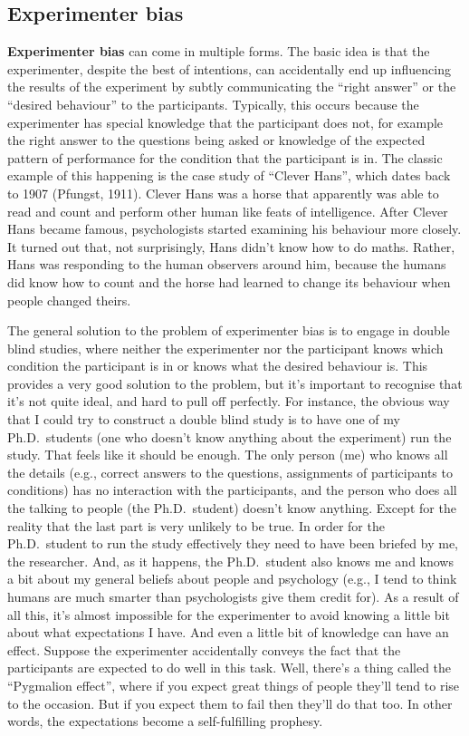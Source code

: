 \documentclass[
  letterpaper,
]{book}
\begin{document}
\hypertarget{experimenter-bias}{%
\subsection{Experimenter bias}\label{experimenter-bias}}

\textbf{Experimenter bias} can come in multiple forms. The basic idea is
that the experimenter, despite the best of intentions, can accidentally
end up influencing the results of the experiment by subtly communicating
the ``right answer'' or the ``desired behaviour'' to the participants.
Typically, this occurs because the experimenter has special knowledge
that the participant does not, for example the right answer to the
questions being asked or knowledge of the expected pattern of
performance for the condition that the participant is in. The classic
example of this happening is the case study of ``Clever Hans'', which
dates back to 1907 (Pfungst, 1911). Clever Hans was a horse that
apparently was able to read and count and perform other human like feats
of intelligence. After Clever Hans became famous, psychologists started
examining his behaviour more closely. It turned out that, not
surprisingly, Hans didn't know how to do maths. Rather, Hans was
responding to the human observers around him, because the humans did
know how to count and the horse had learned to change its behaviour when
people changed theirs.

The general solution to the problem of experimenter bias is to engage in
double blind studies, where neither the experimenter nor the participant
knows which condition the participant is in or knows what the desired
behaviour is. This provides a very good solution to the problem, but
it's important to recognise that it's not quite ideal, and hard to pull
off perfectly. For instance, the obvious way that I could try to
construct a double blind study is to have one of my Ph.D.~students (one
who doesn't know anything about the experiment) run the study. That
feels like it should be enough. The only person (me) who knows all the
details (e.g., correct answers to the questions, assignments of
participants to conditions) has no interaction with the participants,
and the person who does all the talking to people (the Ph.D.~student)
doesn't know anything. Except for the reality that the last part is very
unlikely to be true. In order for the Ph.D.~student to run the study
effectively they need to have been briefed by me, the researcher. And,
as it happens, the Ph.D.~student also knows me and knows a bit about my
general beliefs about people and psychology (e.g., I tend to think
humans are much smarter than psychologists give them credit for). As a
result of all this, it's almost impossible for the experimenter to avoid
knowing a little bit about what expectations I have. And even a little
bit of knowledge can have an effect. Suppose the experimenter
accidentally conveys the fact that the participants are expected to do
well in this task. Well, there's a thing called the ``Pygmalion
effect'', where if you expect great things of people they'll tend to
rise to the occasion. But if you expect them to fail then they'll do
that too. In other words, the expectations become a self-fulfilling
prophesy.
\end{document}
